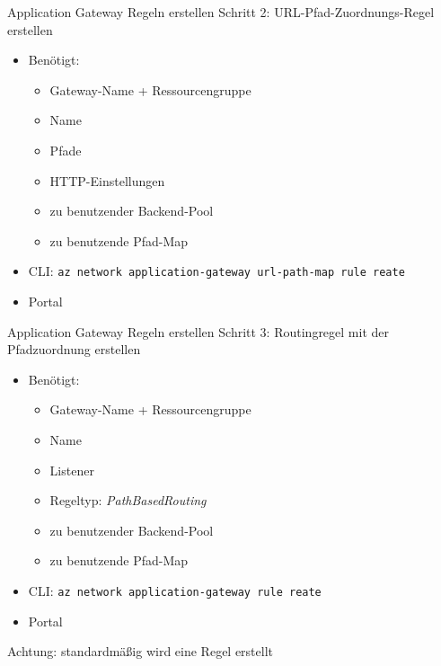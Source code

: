 \begin{flashcard}[Definition]{Application Gateway Regeln erstellen}
    Schritt 2: URL-Pfad-Zuordnungs-Regel erstellen
    \begin{itemize}
        \item Benötigt:
            \begin{itemize}
                \item Gateway-Name + Ressourcengruppe
                \item Name
                \item Pfade
                \item HTTP-Einstellungen
                \item zu benutzender Backend-Pool
                \item zu benutzende Pfad-Map
            \end{itemize}
        \item CLI: \texttt{az network application-gateway url-path-map rule reate}
        \item Portal
    \end{itemize}
\end{flashcard}

\begin{flashcard}[Definition]{Application Gateway Regeln erstellen}
    Schritt 3: Routingregel mit der Pfadzuordnung erstellen
    \begin{itemize}
        \item Benötigt:
            \begin{itemize}
                \item Gateway-Name + Ressourcengruppe
                \item Name
                \item Listener
                \item Regeltyp: \emph{PathBasedRouting}
                \item zu benutzender Backend-Pool
                \item zu benutzende Pfad-Map
            \end{itemize}
        \item CLI: \texttt{az network application-gateway rule reate}
        \item Portal
    \end{itemize}
    Achtung: standardmäßig wird eine Regel erstellt
\end{flashcard}


